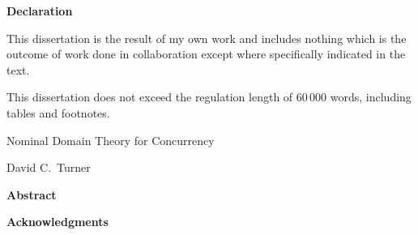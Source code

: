 \documentclass[oneside,draft,titlepage,a4paper]{book}
\begin{document}
\cleardoublepage

\vspace*{60mm}
\textbf{\Large Declaration}
\vspace{10mm}

This dissertation is the result of my own work and includes
nothing which is the outcome of work done in collaboration except
where specifically indicated in the text.

\bigskip
This dissertation does not exceed the regulation length of $60\,000$
words, including tables and footnotes.

\cleardoublepage
\begin{center}
\Large Nominal Domain Theory for Concurrency
\end{center}
\begin{center}
\large David C.~Turner
\end{center}
\vspace{10mm}
\begin{center}
\textbf{\large Abstract}
\end{center}



\clearpage

\vspace*{60mm}
\textbf{\Large Acknowledgments}
\vspace{10mm}



\clearpage
\pagestyle{headings}


\tableofcontents





















\vfill\pagebreak














\end{document}
